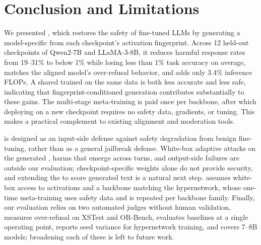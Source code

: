 \section{Conclusion and Limitations}
\label{sec:conclusion}

We presented \method{}, which restores the safety of fine-tuned LLMs by generating a model-specific \ssn{} from each checkpoint's activation fingerprint. Across 12 held-out checkpoints of Qwen2-7B and LLaMA-3-8B, it reduces harmful response rates from 19--31\% to below 1\% while losing less than 1\% task accuracy on average, matches the aligned model's over-refusal behavior, and adds only 3.4\% inference FLOPs. A shared \ssn{} trained on the same data is both less accurate and less safe, indicating that fingerprint-conditioned generation contributes substantially to these gains. The multi-stage meta-training is paid once per backbone, after which deploying on a new checkpoint requires no safety data, gradients, or tuning. This makes \method{} a practical complement to existing alignment and moderation tools.

\method{} is designed as an input-side defense against safety degradation from benign fine-tuning, rather than as a general jailbreak defense. White-box adaptive attacks on the generated \ssn{}, harms that emerge across turns, and output-side failures are outside our evaluation; checkpoint-specific weights alone do not provide security, and extending the \ssn{} to score generated text is a natural next step. \method{} assumes white-box access to activations and a backbone matching the hypernetwork, whose one-time meta-training uses safety data and is repeated per backbone family. Finally, our evaluation relies on two automated judges without human validation, measures over-refusal on XSTest and OR-Bench, evaluates baselines at a single operating point, reports seed variance for hypernetwork training, and covers 7--8B models; broadening each of these is left to future work.
